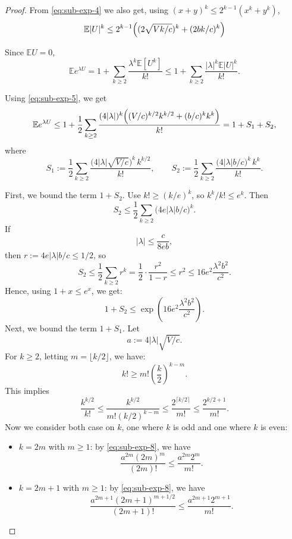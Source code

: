 \begin{proof}
From \eqref{eq:sub-exp-4} we also get, using $(x+y)^k\le 2^{k-1}(x^k+y^k)$,
\begin{equation}\label{eq:sub-exp-5}
    \mathbb E|U|^k
\le 2^{k-1}\Bigl( (2\sqrt{Vk/c})^k + (2bk/c)^k\Bigr)
\end{equation}

Since $\mathbb E U=0$,
\[
\mathbb E e^{\lambda U}
=1+\sum_{k\ge 2}\frac{\lambda^k\mathbb E[U^k]}{k!}
\le 1+\sum_{k\ge 2}\frac{|\lambda|^k\mathbb E|U|^k}{k!}.
\]

Using \eqref{eq:sub-exp-5}, we get
\[
\mathbb E e^{\lambda U}
\le 1+\frac12\sum_{k\ge 2}\frac{(4|\lambda|)^k\Bigl( (V/c)^{k/2}k^{k/2} + (b/c)^k k^k\Bigr)}{k!}
=1+S_1+S_2,
\]
where
\[
S_1:=\frac12\sum_{k\ge 2}\frac{\bigl(4|\lambda|\sqrt{V/c}\bigr)^k\,k^{k/2}}{k!},
\qquad
S_2:=\frac12\sum_{k\ge 2}\frac{\bigl(4|\lambda|b/c\bigr)^k\,k^k}{k!}.
\]

First, we bound the term $1+S_2$. Use $k!\ge (k/e)^k$, so $k^k/k!\le e^k$. Then
\[
S_2
\le \frac12\sum_{k\ge 2}\bigl(4e|\lambda|b/c\bigr)^k.
\]
If
\begin{equation}\label{eq:sub-exp-6}
    |\lambda|\le \frac{c}{8eb},
\end{equation}
then $r:=4e|\lambda|b/c\le 1/2$, so
\[
S_2\le \frac12\sum_{k\ge 2}r^k
=\frac12\cdot \frac{r^2}{1-r}
\le r^2
\le 16e^2\frac{\lambda^2 b^2}{c^2}.
\]
Hence, using $1+x\le e^x$, we get:
\begin{equation}\label{eq:sub-exp-7}
    1+S_2\le \exp\!\left(16e^2\frac{\lambda^2 b^2}{c^2}\right).
\end{equation}
Next, we bound the term $1+S_1$.
Let
\[
a:=4|\lambda|\sqrt{V/c}.
\]
For $k\ge 2$, letting $m=\lfloor k/2\rfloor$, we have:
\[
k! \ge m!\left(\frac{k}{2}\right)^{k-m}.
\]
This implies
\begin{equation}\label{eq:sub-exp-8}
    \frac{k^{k/2}}{k!}
\le \frac{k^{k/2}}{m!(k/2)^{k-m}}
\le \frac{2^{\lceil k/2\rceil}}{m!}
\le \frac{2^{k/2+1}}{m!}.
\end{equation}
Now we consider both case on $k$, one where $k$ is odd and one where $k$ is even:
\begin{itemize}
  \item $k=2m$ with $m\ge 1$: by \eqref{eq:sub-exp-8}, we have
  \[
  \frac{a^{2m}(2m)^{m}}{(2m)!}\le \frac{a^{2m}2^{m}}{m!}.
  \]
  \item $k=2m+1$ with $m\ge 1$: by \eqref{eq:sub-exp-8}, we have
  \[
  \frac{a^{2m+1}(2m+1)^{m+1/2}}{(2m+1)!}
  \le \frac{a^{2m+1}2^{m+1}}{m!}.
  \]
\end{itemize}


\end{proof}
